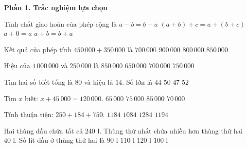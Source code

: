 \textbf{Phần 1. Trắc nghiệm lựa chọn}

\begin{ex} %
Tính chất giao hoán của phép cộng là
\choice
{$a - b = b - a$}
{$(a + b) + c = a + (b + c)$}
{$a + 0 = a$}
{\True $a + b = b + a$}
\end{ex}

\begin{ex} %
Kết quả của phép tính $450\,000 + 350\,000$ là
\choice
{$700\,000$}
{$900\,000$}
{\True $800\,000$}
{$850\,000$}
\end{ex}

\begin{ex} %
Hiệu của $1\,000\,000$ và $250\,000$ là
\choice
{$850\,000$}
{$650\,000$}
{$700\,000$}
{\True $750\,000$}
\end{ex}

\begin{ex} %
Tìm hai số biết tổng là $80$ và hiệu là $14$. Số lớn là
\choice
{$44$}
{$50$}
{\True $47$}
{$52$}
\end{ex}

\begin{ex} %
Tìm $x$ biết: $x + 45\,000 = 120\,000$.
\choice
{$65\,000$}
{\True $75\,000$}
{$85\,000$}
{$70\,000$}
\end{ex}

\begin{ex} %
Tính thuận tiện: $250 + 184 + 750$.
\choice
{\True $1184$}
{$1084$}
{$1284$}
{$1194$}
\end{ex}

\begin{ex} %
Hai thùng dầu chứa tất cả $240\text{ l}$. Thùng thứ nhất chứa nhiều hơn thùng thứ hai $40\text{ l}$. Số lít dầu ở thùng thứ hai là
\choice
{$90\text{ l}$}
{$110\text{ l}$}
{$120\text{ l}$}
{\True $100\text{ l}$}
\end{ex}

